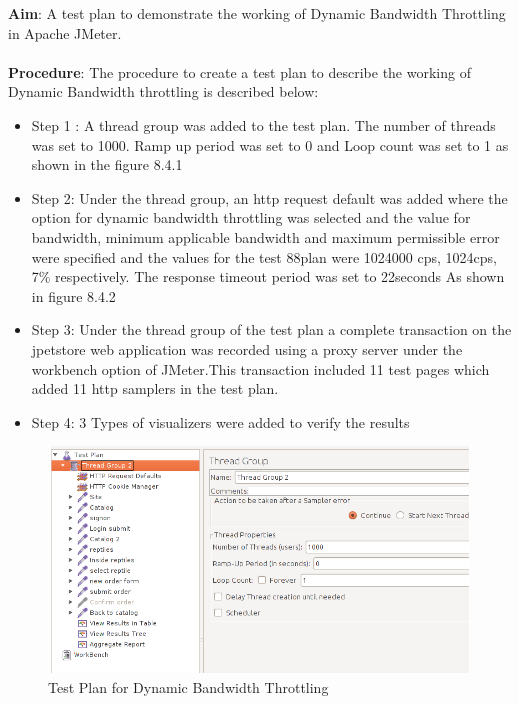 \documentclass[12pt]{book}
\begin{document}
  \textbf{Aim}: A test plan to demonstrate the working of Dynamic Bandwidth Throttling in Apache JMeter.\\
  \\
  \textbf{Procedure}: The procedure to create a test plan to describe the working of Dynamic Bandwidth throttling is described below: \\
  \begin{itemize}
   \item Step 1 : A thread group was added to the test plan. The number of threads was set to 1000. Ramp up period was set to 0 and Loop
	count was set to 1 as shown in the figure 8.4.1\\
   \item Step 2: Under the thread group, an http request default was added where the option for dynamic bandwidth throttling was selected
	and the value for bandwidth, minimum applicable bandwidth and maximum permissible error were specified and the values for the test 
	88plan were 1024000 cps, 1024cps, 7\% respectively. The response timeout period was set to 22seconds As shown in figure 8.4.2\\
   \item Step 3: Under the thread group of the test plan a complete transaction on the jpetstore web application was recorded using
	a proxy server under the workbench option of JMeter.This transaction included 11 test pages which added 11 http samplers in the test plan.\\
   \item Step 4: 3 Types of visualizers were added to verify the results\\
  \end{itemize}
  
  \begin{figure}[H]
   \centering
   \includegraphics[width=15cm, height=6cm]{images/dbt_1}
   \caption{Test Plan for Dynamic Bandwidth Throttling \label{fig:fig58_JMeter}}
  \end{figure}
  
\end{document}
